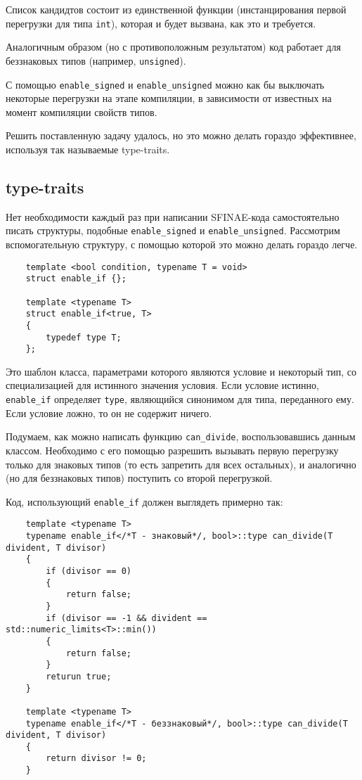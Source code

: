 	Список кандидтов состоит из единственной функции (инстанцирования первой перегрузки для типа \texttt{int}), которая и будет вызвана, как это и требуется.
	
	Аналогичным образом (но с противоположным результатом) код работает для беззнаковых типов (например, \texttt{unsigned}).
	
	С помощью \texttt{enable_signed} и \texttt{enable_unsigned} можно как бы выключать некоторые перегрузки на этапе компиляции, в зависимости от известных на момент компиляции свойств типов.
		
	Решить поставленную задачу удалось, но это можно делать гораздо эффективнее, используя так называемые type-traits.
	
\subsection{type-traits}

	Нет необходимости каждый раз при написании SFINAE-кода самостоятельно писать структуры, подобные \texttt{enable_signed} и \texttt{enable_unsigned}. Рассмотрим вспомогательную структуру, с помощью которой это можно делать гораздо легче.
	
	\begin{verbatim}
	template <bool condition, typename T = void>
	struct enable_if {};
	
	template <typename T>
	struct enable_if<true, T>
	{
		typedef type T;
	};
	\end{verbatim}
	
	Это шаблон класса, параметрами которого являются условие и некоторый тип, со специализацией для истинного значения условия. Если условие истинно, \texttt{enable_if} определяет \texttt{type}, являющийся синонимом для типа, переданного ему. Если условие ложно, то он не содержит ничего. 
	
	Подумаем, как можно написать функцию \texttt{can_divide}, воспользовавшись данным классом. Необходимо с его помощью разрешить вызывать первую перегрузку только для знаковых типов (то есть запретить для всех остальных), и аналогично (но для беззнаковых типов) поступить со второй перегрузкой.
	
	Код, использующий \texttt{enable_if} должен выглядеть примерно так:
	
	\begin{verbatim}
	template <typename T>
	typename enable_if</*T - знаковый*/, bool>::type can_divide(T divident, T divisor)
	{
		if (divisor == 0)
		{
			return false;
		}		
		if (divisor == -1 && divident == std::numeric_limits<T>::min())
		{
			return false;
		}
		returun true;
	}
	
	template <typename T>
	typename enable_if</*T - беззнаковый*/, bool>::type can_divide(T divident, T divisor)
	{
		return divisor != 0;
	}
	\end{verbatim}
	
